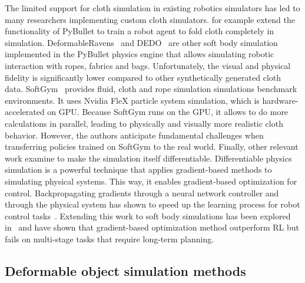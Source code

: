 \documentclass[\home/main.tex]{subfiles}
\begin{document}
The limited support for cloth simulation in existing robotics simulators has led to many researchers implementing custom cloth simulators. \textcite{Matas2018} for example extend the functionality of PyBullet to train a robot agent to fold cloth completely in simulation. DeformableRavens~\autocite{seita2021learning} and DEDO~\autocite{dedo} are other soft body simulation implemented in the PyBullet physics engine that allows simulating robotic interaction with ropes, fabrics and bags. Unfortunately, the visual and physical fidelity is significantly lower compared to other synthetically generated cloth data. SoftGym~\autocite{softgym} provides fluid, cloth and rope simulation simulations benchmark environments. It uses Nvidia FleX particle system simulation, which is hardware-accelerated on GPU. Because SoftGym runs on the GPU, it allows to do more calculations in parallel, leading to physically and visually more realistic cloth behavior. However, the authors anticipate fundamental challenges when transferring policies trained on SoftGym to the real world. Finally, other relevant work examine to make the simulation itself differentiable. Differentiable physics simulation is a powerful technique that applies gradient-based methods to simulating physical systems. This way, it enables gradient-based optimization for control.
Backpropagating gradients through a neural network controller and through the physical system has shown to speed up the learning process for robot control tasks~\autocite{Degrave2019}. Extending this work to soft body simulations has been explored in~\autocite{liang2019differentiable,huang2021plasticinelab} and have shown that gradient-based optimization method outperform RL but fails on multi-stage tasks that require long-term planning.

\subsection{Deformable object simulation methods} \label{subsec:lit_cloth_sim}
\end{document}
